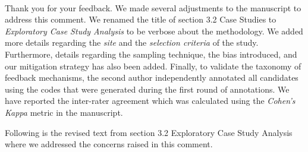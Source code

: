 \documentclass[11pt,fleqn]{article}
\newcommand{\eline}{\vspace*{.75\baselineskip}}
\newcommand{\Us}{\eline \noindent {\bf Response:}\\}
\begin{document}
\Us Thank you for your feedback. We made several adjustments to the manuscript to address this comment. We renamed the title of section 3.2 Case Studies to \emph{Exploratory Case Study Analysis} to be verbose about the methodology. We added more details regarding the \emph{site} and the \emph{selection criteria} of the study. Furthermore, details regarding the sampling technique, the bias introduced, and our mitigation strategy has also been added. Finally, to validate the taxonomy of feedback mechanisms, the second author independently annotated all candidates using the codes that were generated during the first round of annotations. We have reported the inter-rater agreement which was calculated using the \emph{Cohen's Kappa} metric in the manuscript.

Following is the revised text from section 3.2 Exploratory Case Study Analysis where we addressed the concerns raised in this comment.
\end{document}

